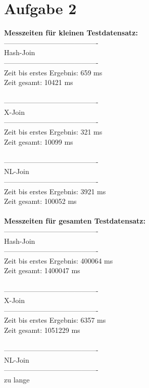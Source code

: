 \documentclass[a4paper]{article}
\begin{document}
\section*{Aufgabe 2}
\textbf{Messzeiten für kleinen Testdatensatz:}\\
----------------------------------------\\
Hash-Join\\
----------------------------------------\\
Zeit bis erstes Ergebnis: 659 ms\\
Zeit gesamt: 10421 ms\\
\\
----------------------------------------\\
X-Join\\
----------------------------------------\\
Zeit bis erstes Ergebnis: 321 ms\\
Zeit gesamt: 10099 ms\\
\\
----------------------------------------\\
NL-Join\\
----------------------------------------\\
Zeit bis erstes Ergebnis: 3921 ms\\
Zeit gesamt: 100052 ms\\
\\
\textbf{Messzeiten für gesamten Testdatensatz:}\\
----------------------------------------\\
Hash-Join\\
----------------------------------------\\
Zeit bis erstes Ergebnis: 400064 ms\\
Zeit gesamt: 1400047 ms\\
\\
----------------------------------------\\
X-Join\\
----------------------------------------\\
Zeit bis erstes Ergebnis: 6357 ms\\
Zeit gesamt: 1051229 ms\\
\\
----------------------------------------\\
NL-Join\\
----------------------------------------\\
zu lange
\end{document}
